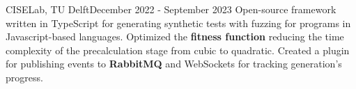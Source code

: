     {CISELab, TU Delft}{December 2022 - September 2023}
    \vspace{6pt}
    \scriptsize { \small{\newline{}Open-source framework written in TypeScript for generating synthetic tests with fuzzing for programs in Javascript-based languages.}}
    \vspace{-4pt}
    \resumeItemListStart
        \subItemOfItem
        {Optimized the \textbf{fitness function} reducing the time complexity of the precalculation stage from cubic to quadratic.}
        \subItemOfItem
        {Created a plugin for publishing events to \textbf{RabbitMQ} and WebSockets for tracking generation's progress.}
    \resumeItemListEnd